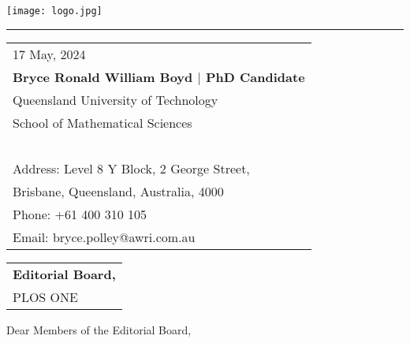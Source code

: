 \documentclass{article}
\begin{document}

\texttt{[image: logo.jpg]} %

\vspace{-1em} %

\rule{\linewidth}{1pt} %

\bigskip\bigskip %


\hfill
\begin{tabular}{l @{}}
	17 May, 2024\\ %
	\textbf{Bryce Ronald William Boyd $|$ PhD Candidate}\\
	Queensland University of Technology \\
	School of Mathematical Sciences\\~\\
	Address: Level 8 Y Block, 2 George Street, \\
	Brisbane, Queensland, Australia, 4000\\
	Phone: +61 400 310 105 \\
	Email: bryce.polley@awri.com.au
\end{tabular}

\newline %


\begin{tabular}{@{} l}
	\textbf{Editorial Board,}\\
	PLOS ONE\\
\end{tabular}

\newline %
Dear Members of the Editorial Board,
\\~\\
\end{document}
